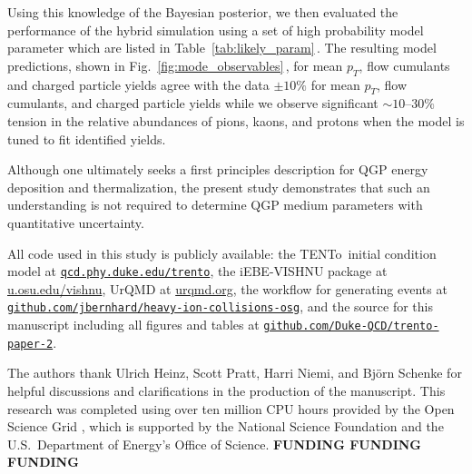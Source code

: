 \documentclass[aps,prc,reprint,amsmath,nofootinbib,superscriptaddress]{revtex4-1}
\newcommand{\trento}{T\raisebox{-0.5ex}{R}ENTo}
\begin{document}
Using this knowledge of the Bayesian posterior, we then evaluated the performance of the hybrid simulation using a set of high probability model parameter which are listed in Table~\ref{tab:likely_param}\,. The resulting model predictions, shown in Fig.~\ref{fig:mode_observables}\,, for mean $p_T$, flow cumulants and charged particle yields agree with the data $\pm10\%$ for mean $p_T$, flow cumulants, and charged particle yields while we observe significant $\sim\!10$--$30\%$ tension in the relative abundances of pions, kaons, and protons when the model is tuned to fit identified yields.

Although one ultimately seeks a first principles description for QGP energy deposition and thermalization, the present study demonstrates that such an understanding is not required to determine QGP medium parameters with quantitative uncertainty. 

\medskip

\newcommand{\nicelink}[2][http]{\mbox{\href{#1://#2}{\nolinkurl{#2}}}}

All code used in this study is publicly available:
the \trento\ initial condition model at \nicelink{qcd.phy.duke.edu/trento},
the iEBE-VISHNU package at \url{u.osu.edu/vishnu},
UrQMD at \url{urqmd.org},
the workflow for generating events at \nicelink[https]{github.com/jbernhard/heavy-ion-collisions-osg},
and the source for this manuscript including all figures and tables at \nicelink[https]{github.com/Duke-QCD/trento-paper-2}.

\begin{acknowledgments}
The authors thank Ulrich Heinz, Scott Pratt, Harri Niemi, and Bj\"orn Schenke for helpful discussions and clarifications in the production of the manuscript.
This research was completed using over ten million CPU hours provided by the Open Science Grid \cite{Pordes:2007zzb,Sfiligoi:2010zz}, which is supported by the National Science Foundation and the U.S.\ Department of Energy's Office of Science.
\textbf{FUNDING FUNDING FUNDING}
\end{acknowledgments}


\end{document}
